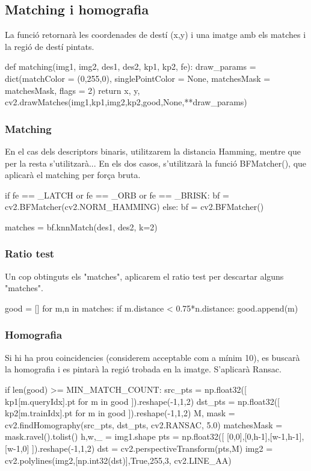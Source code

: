 \newpage
	\subsection{Matching i homografia}
La funció retornarà les coordenades de destí (x,y) i una imatge amb els matches i la regió de destí pintats.\\
		\begin{python}
def matching(img1, img2, des1, des2, kp1, kp2, fe):
	draw_params = dict(matchColor = (0,255,0), singlePointColor = None,
					matchesMask = matchesMask, flags = 2)
	return x, y, cv2.drawMatches(img1,kp1,img2,kp2,good,None,**draw_params)
		\end{python}

		\subsubsection{Matching}
		En el cas dels descriptors binaris, utilitzarem la distancia Hamming, mentre que per la resta s'utilitzarà... En els dos casos, s'utilitzarà la funció BFMatcher(), que aplicarà el matching
		per força bruta.\\
		\begin{python}
	if fe == _LATCH or fe == _ORB or fe == _BRISK:
		bf = cv2.BFMatcher(cv2.NORM_HAMMING)
	else:
		bf = cv2.BFMatcher()

	matches = bf.knnMatch(des1, des2, k=2)
		\end{python}

		\subsubsection{Ratio test}
Un cop obtinguts els "matches", aplicarem el ratio test per descartar alguns "matches".\\
		\begin{python}
	good = []
	for m,n in matches:
		if m.distance < 0.75*n.distance:
			good.append(m)
		\end{python}

\newpage
		\subsubsection{Homografia}
Si hi ha prou coincidencies (considerem acceptable com a mínim 10), es buscarà la homografia i es pintarà la regió trobada en la imatge. S'aplicarà Ransac. \\
		\begin{python}
	if len(good) >= MIN_MATCH_COUNT:
		src_pts = np.float32([ kp1[m.queryIdx].pt for m in good ]).reshape(-1,1,2)
		dst_pts = np.float32([ kp2[m.trainIdx].pt for m in good ]).reshape(-1,1,2)
		M, mask = cv2.findHomography(src_pts, dst_pts, cv2.RANSAC, 5.0)
		matchesMask = mask.ravel().tolist()
		h,w,_ = img1.shape
		pts = np.float32([ [0,0],[0,h-1],[w-1,h-1],[w-1,0] ]).reshape(-1,1,2)
		dst = cv2.perspectiveTransform(pts,M)
		img2 = cv2.polylines(img2,[np.int32(dst)],True,255,3, cv2.LINE_AA)
		\end{python}

